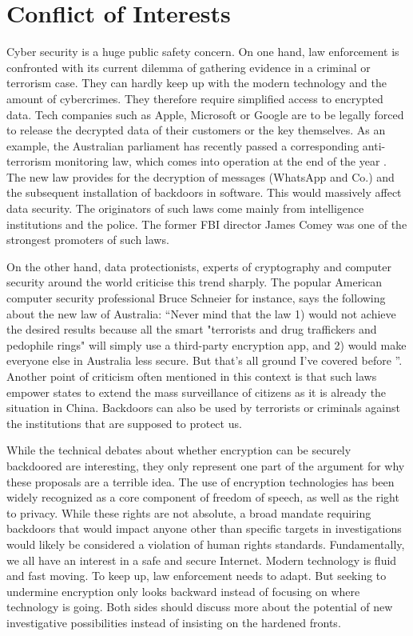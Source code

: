 \documentclass[a4paper, 11pt]{article}
\begin{document}
\section*{Conflict of Interests}
Cyber security is a huge public safety concern. On one hand, law enforcement is confronted with its current dilemma of gathering evidence in a criminal or terrorism case. They can hardly keep up with the modern technology and the amount of cybercrimes. They therefore require simplified access to encrypted data. Tech companies such as Apple, Microsoft or Google are to be legally forced to release the decrypted data of their customers or the key themselves. As an example, the Australian parliament has recently passed a corresponding anti-terrorism monitoring law, which comes into operation at the end of the year \cite{AUSTRLAW}. The new law provides for the decryption of messages (WhatsApp and Co.) and the subsequent installation of backdoors in software. This would massively affect data security. The originators of such laws come mainly from intelligence institutions and the police. The former FBI director James Comey was one of the strongest promoters of such laws. 
\par On the other hand, data protectionists, experts of cryptography and computer security around the world criticise this trend sharply. The popular American computer security professional Bruce Schneier for instance, says the following about the new law of Australia: \enquote{Never mind that the law 1) would not achieve the desired results because all the smart "terrorists and drug traffickers and pedophile rings" will simply use a third-party encryption app, and 2) would make everyone else in Australia less secure. But that's all ground I've covered before \cite{SCHNEIERBLOG}}. Another point of criticism often mentioned in this context is that such laws empower states to extend the mass surveillance of citizens as it is already the situation in China. Backdoors can also be used by terrorists or criminals against the institutions that are supposed to protect us.
\par While the technical debates about whether encryption can be securely backdoored are interesting, they only represent one part of the argument for why these proposals are a terrible idea. The use of encryption technologies has been widely recognized as a core component of freedom of speech, as well as the right to privacy. While these rights are not absolute, a broad mandate requiring backdoors that would impact anyone other than specific targets in investigations would likely be considered a violation of human rights standards. Fundamentally, we all have an interest in a safe and secure Internet. Modern technology is fluid and fast moving. To keep up, law enforcement needs to adapt. But seeking to undermine encryption only looks backward instead of focusing on where technology is going. Both sides should discuss more about the potential of new investigative possibilities instead of insisting on the hardened fronts.
\end{document}
